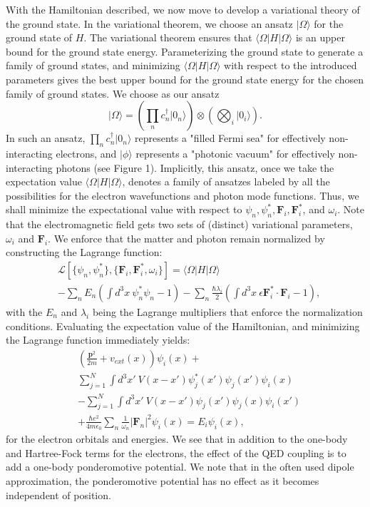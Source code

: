 \documentclass[aps,prl,twocolumn,
	groupedaddress,superscriptaddress,
	amsfonts,amssymb,amsmath,floatfix,
	citeautoscript]{revtex4-1}
\begin{document}
With the Hamiltonian described, we now move to develop a variational theory of the ground state. In the variational theorem, we choose an ansatz $|\Omega\rangle$ for the ground state of $H$. The variational theorem ensures that $\langle \Omega|H|\Omega\rangle$ is an upper bound for the ground state energy. Parameterizing the ground state to generate a family of ground states, and minimizing $\langle \Omega|H|\Omega\rangle$ with respect to the introduced parameters gives the best upper bound for the ground state energy for the chosen family of ground states.  We choose as our ansatz
\begin{equation}
|\Omega\rangle = \left( \prod\limits_n c_n^{\dagger}|0_n\rangle\right) \otimes \left(\bigotimes_i|0_i\rangle\right).
\end{equation}
In such an ansatz, $\prod\limits_n c_n^{\dagger}|0_n\rangle$ represents a "filled Fermi sea" for effectively non-interacting electrons, and $|\phi\rangle$ represents a "photonic vacuum" for effectively non-interacting photons (see Figure 1). Implicitly, this ansatz, once we take the expectation value $\langle \Omega|H|\Omega\rangle$, denotes a family of ansatzes labeled by all the possibilities for the electron wavefunctions and photon mode functions. Thus, we shall minimize the expectational value with respect to $\psi_n, \psi_n^*, \mathbf{F}_i, \mathbf{F}_i^*$, and $\omega_i$. Note that the electromagnetic field gets two sets of (distinct) variational parameters, $\omega_i$ and $\mathbf{F}_i$. We enforce that the matter and photon remain normalized by constructing the Lagrange function:
\begin{align}
&\mathcal{L}[\{ \psi_n,\psi_n^* \},\{ \mathbf{F}_i,\mathbf{F}_i^*,\omega_i \}] = \langle \Omega |H|\Omega\rangle \\
&- \sum_n E_n\left(\int d^3x ~\psi_n^*\psi_n - 1 \right) - \sum_n \frac{\hbar\lambda_i}{2}\left(\int d^3x ~\epsilon\mathbf{F}_i^*\cdot\mathbf{F}_i - 1 \right),\nonumber
\end{align}
with the $E_n$ and $\lambda_i$ being the Lagrange multipliers that enforce the normalization conditions. Evaluating the expectation value of the Hamiltonian, and minimizing the Lagrange function  immediately yields:
\begin{align}
&\left(\frac{\mathbf{p}^2}{2m}+v_{ext}(x) \right)\psi_i(x) + \nonumber \\ &\sum\limits_{j=1}^N \int d^3x' ~ V(x-x')\psi^*_j(x')\psi_j(x')\psi_i(x) \nonumber \\ & - \sum\limits_{j=1}^N \int d^3x' ~ V(x-x')\psi_j(x')\psi_j(x)\psi_i(x')  \nonumber \\ &+ \frac{\hbar e^2}{4m\epsilon_0}\sum_n \frac{1}{\omega_n}|\mathbf{F}_n|^2\psi_i(x)   = E_i\psi_i(x),
\end{align}
for the electron orbitals and energies. We see that in addition to the one-body and Hartree-Fock terms for the electrons, the effect of the QED coupling is to add a one-body ponderomotive potential. We note that in the often used dipole approximation, the ponderomotive potential has no effect as it becomes independent of position.
\end{document}
